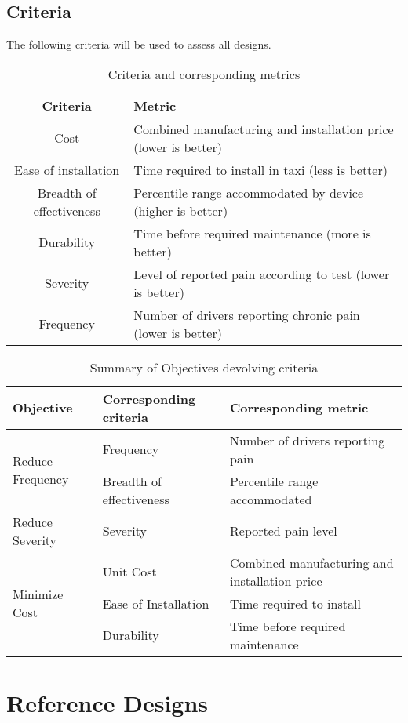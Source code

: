 \documentclass[11pt]{article}
\begin{document}
\subsection{Criteria}
The following criteria will be used to assess all designs.
\begin{table}[h]
\centering
\caption{Criteria and corresponding metrics}
\begin{tabular}{c p{10cm} }
  Criteria & Metric \\ \hline
  Cost & Combined manufacturing and installation price (lower is better) \\
  Ease of installation & Time required to install in taxi (less is better) \\
  Breadth of effectiveness & Percentile range accommodated by device (higher is better) \\
  Durability & Time before required maintenance (more is better) \\
  Severity & Level of reported pain according to test (lower is better) \\
  Frequency & Number of drivers reporting chronic pain (lower is better)
\end{tabular}
\end{table}

\begin{table}[h!]
\centering
\caption{Summary of Objectives devolving criteria}
\begin{tabular}{l l p{5cm}}
Objective & Corresponding criteria & Corresponding metric \\ \hline
\multirow{2}{*}{Reduce Frequency} & Frequency & Number of drivers reporting pain \\
& Breadth of effectiveness & Percentile range accommodated \\ \hline
Reduce Severity & Severity & Reported pain level \\ \hline
\multirow{3}{*}{Minimize Cost} & Unit Cost & Combined manufacturing and installation price \\
& Ease of Installation & Time required to install \\
& Durability & Time before required maintenance \\
\end{tabular}
\end{table}
\newpage
\section{Reference Designs}
\label{sec:designs}
\end{document}
